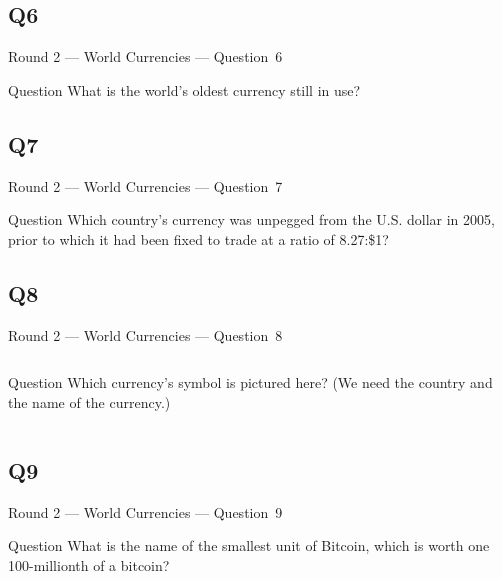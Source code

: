 \documentclass[11pt]{beamer}
\begin{document}
\subsection*{Q6}
\begin{frame}[t]{Round 2 --- World Currencies --- \mbox{Question 6}}
\vspace{-0.5em}
\begin{block}{Question}
What is the world's oldest currency still in use?
\end{block}
\end{frame}
\subsection*{Q7}
\begin{frame}[t]{Round 2 --- World Currencies --- \mbox{Question 7}}
\vspace{-0.5em}
\begin{block}{Question}
Which country's currency was unpegged from the U.S. dollar in 2005, prior to which it had been fixed to trade at a ratio of 8.27:\$1?
\end{block}
\end{frame}
\subsection*{Q8}
\begin{frame}[t]{Round 2 --- World Currencies --- \mbox{Question 8}}
\vspace{-0.5em}
\begin{columns}[T,totalwidth=\linewidth]
\begin{column}{0.32\linewidth}
\begin{block}{Question}
Which currency's symbol is pictured here? (We need the country and the name of the currency.)
\end{block}
\end{column}
\begin{column}{0.65\linewidth}
\begin{center}
\texttt{[image: \{Images/rupee]}.png}
\end{center}
\end{column}
\end{columns}
\end{frame}
\subsection*{Q9}
\begin{frame}[t]{Round 2 --- World Currencies --- \mbox{Question 9}}
\vspace{-0.5em}
\begin{block}{Question}
What is the name of the smallest unit of Bitcoin, which is worth one 100-millionth of a bitcoin?
\end{block}
\end{frame}
\end{document}
